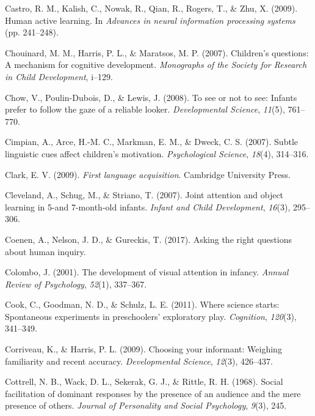 \documentclass[oneside]{report}
\begin{document}
\leavevmode\hypertarget{ref-castro2009human}{}%
Castro, R. M., Kalish, C., Nowak, R., Qian, R., Rogers, T., \& Zhu, X.
(2009). Human active learning. In \emph{Advances in neural information
processing systems} (pp. 241--248).

\leavevmode\hypertarget{ref-chouinard2007children}{}%
Chouinard, M. M., Harris, P. L., \& Maratsos, M. P. (2007). Children's
questions: A mechanism for cognitive development. \emph{Monographs of
the Society for Research in Child Development}, i--129.

\leavevmode\hypertarget{ref-chow2008see}{}%
Chow, V., Poulin-Dubois, D., \& Lewis, J. (2008). To see or not to see:
Infants prefer to follow the gaze of a reliable looker.
\emph{Developmental Science}, \emph{11}(5), 761--770.

\leavevmode\hypertarget{ref-cimpian2007subtle}{}%
Cimpian, A., Arce, H.-M. C., Markman, E. M., \& Dweck, C. S. (2007).
Subtle linguistic cues affect children's motivation. \emph{Psychological
Science}, \emph{18}(4), 314--316.

\leavevmode\hypertarget{ref-clark2009first}{}%
Clark, E. V. (2009). \emph{First language acquisition}. Cambridge
University Press.

\leavevmode\hypertarget{ref-cleveland2007joint}{}%
Cleveland, A., Schug, M., \& Striano, T. (2007). Joint attention and
object learning in 5-and 7-month-old infants. \emph{Infant and Child
Development}, \emph{16}(3), 295--306.

\leavevmode\hypertarget{ref-coenen2017asking}{}%
Coenen, A., Nelson, J. D., \& Gureckis, T. (2017). Asking the right
questions about human inquiry.

\leavevmode\hypertarget{ref-colombo2001development}{}%
Colombo, J. (2001). The development of visual attention in infancy.
\emph{Annual Review of Psychology}, \emph{52}(1), 337--367.

\leavevmode\hypertarget{ref-cook2011science}{}%
Cook, C., Goodman, N. D., \& Schulz, L. E. (2011). Where science starts:
Spontaneous experiments in preschoolers' exploratory play.
\emph{Cognition}, \emph{120}(3), 341--349.

\leavevmode\hypertarget{ref-corriveau2009choosing}{}%
Corriveau, K., \& Harris, P. L. (2009). Choosing your informant:
Weighing familiarity and recent accuracy. \emph{Developmental Science},
\emph{12}(3), 426--437.

\leavevmode\hypertarget{ref-cottrell1968social}{}%
Cottrell, N. B., Wack, D. L., Sekerak, G. J., \& Rittle, R. H. (1968).
Social facilitation of dominant responses by the presence of an audience
and the mere presence of others. \emph{Journal of Personality and Social
Psychology}, \emph{9}(3), 245.
\end{document}
